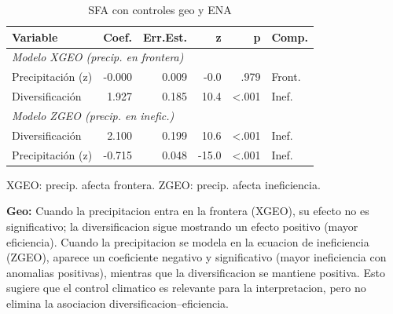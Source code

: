 \documentclass[10pt,a4paper]{article}
\begin{document}
\begin{table}[H]
\centering
\caption{SFA con controles geo y ENA}
\label{tab:sfa_geo}
\begin{threeparttable}
\small
\begin{tabular}{lrrrrl}
\toprule
\textbf{Variable} & \textbf{Coef.} & \textbf{Err.Est.} & \textbf{z} & \textbf{p} & \textbf{Comp.} \\
\midrule
\multicolumn{6}{l}{\textit{Modelo XGEO (precip. en frontera)}} \\
Precipitación (z) & -0.000 & 0.009 & -0.0 & .979 & Front. \\
Diversificación & 1.927 & 0.185 & 10.4 & <.001 & Inef. \\
\midrule
\multicolumn{6}{l}{\textit{Modelo ZGEO (precip. en inefic.)}} \\
Diversificación & 2.100 & 0.199 & 10.6 & <.001 & Inef. \\
Precipitación (z) & -0.715 & 0.048 & -15.0 & <.001 & Inef. \\
\bottomrule
\end{tabular}
\begin{tablenotes}
\footnotesize
\item XGEO: precip. afecta frontera. ZGEO: precip. afecta ineficiencia.
\end{tablenotes}
\end{threeparttable}
\end{table}

\textbf{Geo:} Cuando la precipitacion entra en la frontera (XGEO), su efecto no es significativo; la diversificacion sigue mostrando un efecto positivo (mayor eficiencia). Cuando la precipitacion se modela en la ecuacion de ineficiencia (ZGEO), aparece un coeficiente negativo y significativo (mayor ineficiencia con anomalias positivas), mientras que la diversificacion se mantiene positiva. Esto sugiere que el control climatico es relevante para la interpretacion, pero no elimina la asociacion diversificacion--eficiencia.
\end{document}
